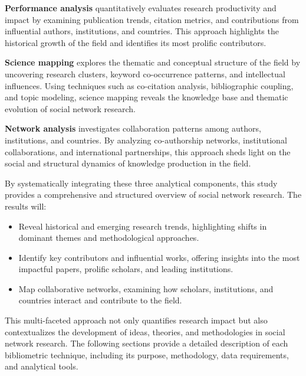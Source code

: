 \documentclass[twocolumn]{article}
\begin{document}
	\textbf{Performance analysis} quantitatively evaluates research productivity and impact by examining publication trends, citation metrics, and contributions from influential authors, institutions, and countries. This approach highlights the historical growth of the field and identifies its most prolific contributors.
	
	\textbf{Science mapping} explores the thematic and conceptual structure of the field by uncovering research clusters, keyword co-occurrence patterns, and intellectual influences. Using techniques such as co-citation analysis, bibliographic coupling, and topic modeling, science mapping reveals the knowledge base and thematic evolution of social network research.
	
	\textbf{Network analysis} investigates collaboration patterns among authors, institutions, and countries. By analyzing co-authorship networks, institutional collaborations, and international partnerships, this approach sheds light on the social and structural dynamics of knowledge production in the field.
	
	By systematically integrating these three analytical components, this study provides a comprehensive and structured overview of social network research. The results will:
	\begin{itemize}
		\item Reveal historical and emerging research trends, highlighting shifts in dominant themes and methodological approaches.
		\item Identify key contributors and influential works, offering insights into the most impactful papers, prolific scholars, and leading institutions.
		\item Map collaborative networks, examining how scholars, institutions, and countries interact and contribute to the field.
	\end{itemize}
	
	This multi-faceted approach not only quantifies research impact but also contextualizes the development of ideas, theories, and methodologies in social network research. The following sections provide a detailed description of each bibliometric technique, including its purpose, methodology, data requirements, and analytical tools.
	
\end{document}
